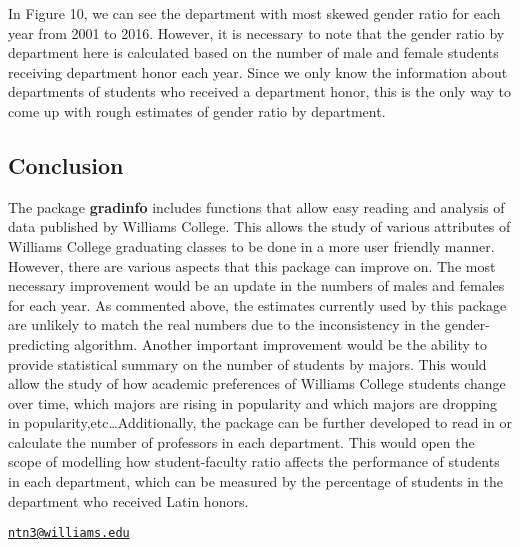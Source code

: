 In Figure 10, we can see the department with most skewed gender ratio
for each year from 2001 to 2016. However, it is necessary to note that
the gender ratio by department here is calculated based on the number of
male and female students receiving department honor each year. Since we
only know the information about departments of students who received a
department honor, this is the only way to come up with rough estimates
of gender ratio by department.

\newpage

\subsection{Conclusion}\label{conclusion}

The package \textbf{gradinfo} includes functions that allow easy reading
and analysis of data published by Williams College. This allows the
study of various attributes of Williams College graduating classes to be
done in a more user friendly manner. However, there are various aspects
that this package can improve on. The most necessary improvement would
be an update in the numbers of males and females for each year. As
commented above, the estimates currently used by this package are
unlikely to match the real numbers due to the inconsistency in the
gender-predicting algorithm. Another important improvement would be the
ability to provide statistical summary on the number of students by
majors. This would allow the study of how academic preferences of
Williams College students change over time, which majors are rising in
popularity and which majors are dropping in
popularity,etc\ldots{}Additionally, the package can be further developed
to read in or calculate the number of professors in each department.
This would open the scope of modelling how student-faculty ratio affects
the performance of students in each department, which can be measured by
the percentage of students in the department who received Latin honors.

\address{%
Nam Nguyen\\
Williams College\\
P.O 1871, Paresky Center, Williams College, Williamstown, Massachusetts\\
}
\href{mailto:ntn3@williams.edu}{\nolinkurl{ntn3@williams.edu}}

